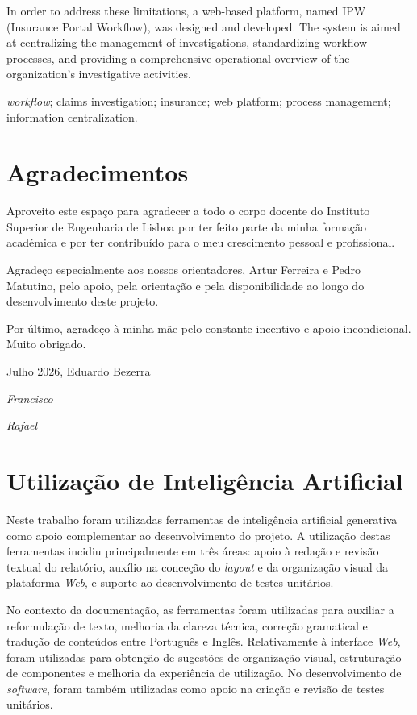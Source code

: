 \documentclass[a4paper,openright,twoside,11pt]{report}
\begin{document}
In order to address these limitations, a web-based platform, named IPW (Insurance Portal Workflow), was designed and developed. The system is aimed at centralizing the management of investigations, standardizing workflow processes, and providing a comprehensive operational overview of the organization's investigative activities.

\bigskip
{} \textit{workflow}; claims investigation; insurance; web platform; process management; information centralization.


\cleardoublepage
\chapter*{Agradecimentos}



\noindent Aproveito este espaço para agradecer a todo o corpo docente do Instituto Superior de Engenharia de Lisboa por ter feito parte da minha formação académica e por ter contribuído para o meu crescimento pessoal e profissional.

\noindent Agradeço especialmente aos nossos orientadores, Artur Ferreira e Pedro Matutino, pelo apoio, pela orientação e pela disponibilidade ao longo do desenvolvimento deste projeto.

\noindent Por último, agradeço à minha mãe pelo constante incentivo e apoio incondicional. Muito obrigado.

\hfill Julho 2026, Eduardo Bezerra

\textit{Francisco}


\textit{Rafael}



\cleardoublepage
\chapter*{Utilização de Inteligência Artificial}
\noindent
Neste trabalho foram utilizadas ferramentas de inteligência artificial generativa como apoio complementar ao desenvolvimento do projeto. A utilização destas ferramentas incidiu principalmente em três áreas: apoio à redação e revisão textual do relatório, auxílio na conceção do \textit{layout} e da organização visual da plataforma \textit{Web}, e suporte ao desenvolvimento de testes unitários.

No contexto da documentação, as ferramentas foram utilizadas para auxiliar a reformulação de texto, melhoria da clareza técnica, correção gramatical e tradução de conteúdos entre Português e Inglês. Relativamente à interface \textit{Web}, foram utilizadas para obtenção de sugestões de organização visual, estruturação de componentes e melhoria da experiência de utilização. No desenvolvimento de \textit{software}, foram também utilizadas como apoio na criação e revisão de testes unitários.
\end{document}
